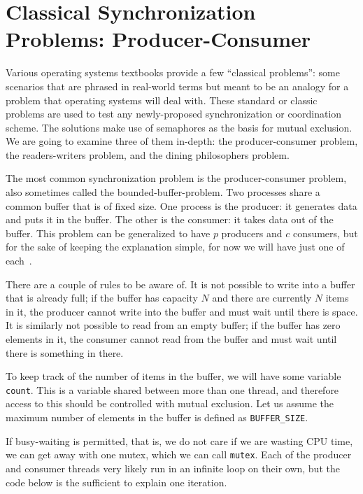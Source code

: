 




\section*{Classical Synchronization Problems: Producer-Consumer}

Various operating systems textbooks provide a few ``classical problems'': some scenarios that are phrased in real-world terms but meant to be an analogy for a problem that operating systems will deal with. These standard or classic problems are used to test any newly-proposed synchronization or coordination scheme. The solutions make use of semaphores as the basis for mutual exclusion. We are going to examine three of them in-depth: the producer-consumer problem, the readers-writers problem, and the dining philosophers problem.

The most common synchronization problem is the producer-consumer problem, also sometimes called the bounded-buffer-problem. Two processes share a common buffer that is of fixed size. One process is the producer: it generates data and puts it in the buffer. The other is the consumer: it takes data out of the buffer. This problem can be generalized to have $p$ producers and $c$ consumers, but for the sake of keeping the explanation simple, for now we will have just one of each~\cite{mos}.

There are a couple of rules to be aware of. It is not possible to write into a buffer that is already full; if the buffer has capacity $N$ and there are currently $N$ items in it, the producer cannot write into the buffer and must wait until there is space. It is similarly not possible to read from an empty buffer; if the buffer has zero elements in it, the consumer cannot read from the buffer and must wait until there is something in there. 

To keep track of the number of items in the buffer, we will have some variable \texttt{count}. This is a variable shared between more than one thread, and therefore access to this should be controlled with mutual exclusion. Let us assume the maximum number of elements in the buffer is defined as \texttt{BUFFER\_SIZE}.

If busy-waiting is permitted, that is, we do not care if we are wasting CPU time, we can get away with one mutex, which we can call \texttt{mutex}. Each of the producer and consumer threads very likely run in an infinite loop on their own, but the code below is the sufficient to explain one iteration.

